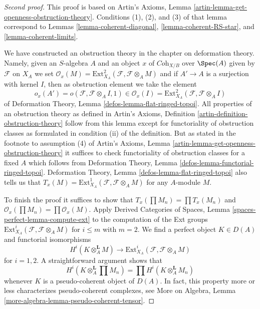 \begin{proof}[Second proof]
This proof is based on
Artin's Axioms, Lemma \ref{artin-lemma-get-openness-obstruction-theory}.
Conditions (1), (2), and (3) of that lemma correspond to
Lemmas \ref{lemma-coherent-diagonal},
\ref{lemma-coherent-RS-star}, and
\ref{lemma-coherent-limits}.

\medskip\noindent
We have constructed an obstruction theory in the chapter on
deformation theory. Namely, given an $S$-algebra $A$ and an
object $x$ of $\textit{Coh}_{X/B}$ over $\Spec(A)$ given
by $\mathcal{F}$ on $X_A$ we set
$\mathcal{O}_x(M) = \text{Ext}^2_{X_A}(\mathcal{F}, \mathcal{F} \otimes_A M)$
and if $A' \to A$ is a surjection with kernel $I$, then as obstruction
element we take the element
$$
o_x(A') = o(\mathcal{F}, \mathcal{F} \otimes_A I, 1) \in
\mathcal{O}_x(I) = \text{Ext}^2_{X_A}(\mathcal{F}, \mathcal{F} \otimes_A I)
$$
of Deformation Theory, Lemma \ref{defos-lemma-flat-ringed-topoi}.
All properties of an obstruction theory as defined in
Artin's Axioms, Definition \ref{artin-definition-obstruction-theory}
follow from this lemma except for functoriality of obstruction classes
as formulated in condition (ii) of the definition. But as stated in
the footnote to assumption (4) of
Artin's Axioms, Lemma \ref{artin-lemma-get-openness-obstruction-theory}
it suffices to check functoriality of obstruction classes
for a fixed $A$ which follows from
Deformation Theory, Lemma \ref{defos-lemma-functorial-ringed-topoi}.
Deformation Theory, Lemma \ref{defos-lemma-flat-ringed-topoi}
also tells us that
$T_x(M) = \text{Ext}^1_{X_A}(\mathcal{F}, \mathcal{F} \otimes_A M)$
for any $A$-module $M$.

\medskip\noindent
To finish the proof it suffices to show that
$T_x(\prod M_n) = \prod T_x(M_n)$ and
$\mathcal{O}_x(\prod M_n) = \prod \mathcal{O}_x(M)$.
Apply Derived Categories of Spaces, Lemma
\ref{spaces-perfect-lemma-compute-ext}
to the computation of the Ext groups
$\text{Ext}^i_{X_A}(\mathcal{F}, \mathcal{F} \otimes_A M)$
for $i \leq m$ with $m = 2$. We find a perfect object $K \in D(A)$
and functorial isomorphisms
$$
H^i(K \otimes_A^\mathbf{L} M)
\longrightarrow
\text{Ext}^i_{X_A}(\mathcal{F}, \mathcal{F} \otimes_A M)
$$
for $i = 1, 2$. A straightforward argument shows that
$$
H^i(K \otimes_A^\mathbf{L} \prod M_n) =
\prod H^i(K \otimes_A^\mathbf{L} M_n)
$$
whenever $K$ is a pseudo-coherent object of $D(A)$.
In fact, this property more or less characterizes
pseudo-coherent complexes, see
More on Algebra, Lemma \ref{more-algebra-lemma-pseudo-coherent-tensor}.
\end{proof}

